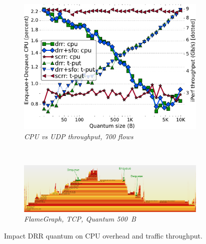 \begin{figure}[th!]
\begin{subfigure}[t]{.30\linewidth}
    \centering
    \includegraphics[width=0.95\linewidth]{figs/burst_cn_6u1x100_Cb_2G_kp_bw_drr_basic_fq_drr_scrr-neia.pdf}
    \caption{\small{\textit{CPU vs UDP throughput, 700 flows}}}
    \label{fig:cpu-quanta-udp-lat-100f}
  \end{subfigure}
  \\
  \begin{subfigure}[t]{\linewidth}
    \centering
    \includegraphics[width=0.95\linewidth]{figs/burst_cn_6t1x100_flame_drr_basic.pdf}
    \caption{\small{\textit{FlameGraph, TCP, Quantum 500~B}}}
    \label{fig:cpu-quanta-tcp-flamegraph}
  \end{subfigure}
  \vspace{-3mm}
  \caption{\small{Impact DRR quantum on CPU overhead and traffic throughput.}}
  \vspace{-0.4cm}
  \label{fig:cpu-drr-quantum}
\end{figure}
